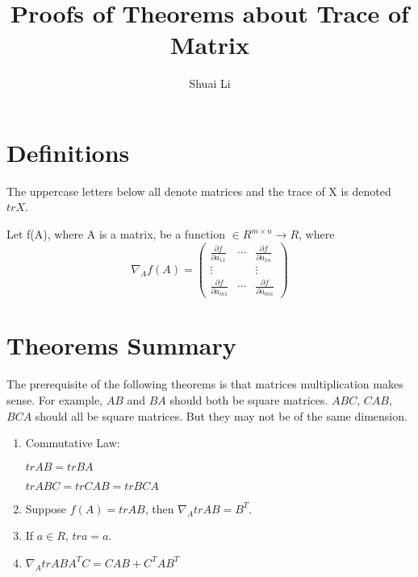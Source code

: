 \documentclass[a4paper]{article}
\title{Proofs of Theorems about Trace of Matrix}
\author{Shuai Li}
\newenvironment{definition}[1][Definition]{\begin{trivlist}
\item[\hskip \labelsep {\bfseries #1}]}{\end{trivlist}}
\begin{document}
\maketitle
\tableofcontents
\pagebreak

\section{Definitions}

\begin{definition}
  The uppercase letters below all denote matrices and the trace of X is
  denoted $trX$.
\end{definition}

\begin{definition}
	Let f(A), where A is a matrix, be a function $\in R^{m\times n} \to
	R $, where
	\begin{displaymath}
		\nabla_Af(A) =
		\begin{pmatrix}
			\frac{\partial f}{\partial a_{11}} & \cdots & \frac{\partial f}{\partial a_{1n}}\\
			\vdots &  & \vdots\\
			\frac{\partial f}{\partial a_{m1}} & \cdots & \frac{\partial f}{\partial a_{mn}}
		\end{pmatrix}
\end{displaymath}

\end{definition}

\section{Theorems Summary}

The prerequisite of the following theorems is that matrices
multiplication makes sense. For example, $AB$ and $BA$ should both be
square matrices. $ABC$, $CAB$, $BCA$ should all be square matrices. But
they may not be of the same dimension.

\begin{enumerate}
	\item Commutative Law:

		$trAB = trBA$  

		$trABC = trCAB = trBCA$
	\item Suppose $f(A) = trAB$, then $\nabla_A trAB = B^T$.
	\item If $a \in R$, $tra = a$.
	\item $\nabla_A trABA^TC = CAB + C^TAB^T$
\end{enumerate}
\end{document}

